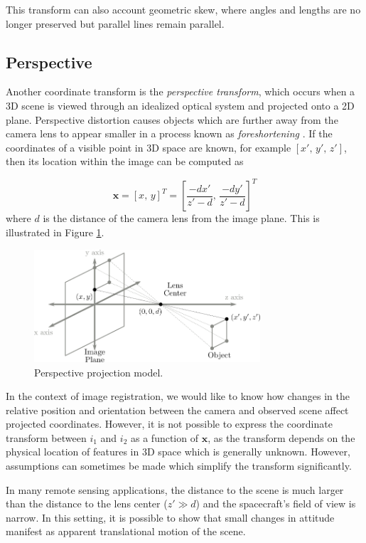 \documentclass[tocnosub,noragright,centerchapter,12pt]{uiucecethesis09}
\begin{document}
This transform can also account geometric skew, where angles and lengths are no longer preserved but parallel lines remain parallel.

\subsection{Perspective}

Another coordinate transform is the \emph{perspective transform}, which occurs when a 3D scene is viewed through an idealized optical system and projected onto a 2D plane.  Perspective distortion causes objects which are further away from the camera lens to appear smaller in a process known as \emph{foreshortening} \cite{brown}.  If the coordinates of a visible point in 3D space are known, for example $[x',\, y',\, z']$, then its location within the image can be computed as

$$\bm{x} = [x,\, y]^T = \left[ \frac{-dx'}{z' - d},\, \frac{-dy'}{z' - d} \right]^T$$
where $d$ is the distance of the camera lens from the image plane.  This is illustrated in Figure \ref{fig:perspective}.

\begin{figure}
  \centering
  \includegraphics[width=0.75\textwidth]{figures/perspective.png}
  \caption{Perspective projection model.}
  \label{fig:perspective}
\end{figure}

In the context of image registration, we would like to know how changes in the relative position and orientation between the camera and observed scene affect projected coordinates.  However, it is not possible to express the coordinate transform between $i_1$ and $i_2$ as a function of $\bm{x}$, as the transform depends on the physical location of features in 3D space which is generally unknown.  However, assumptions can sometimes be made which simplify the transform significantly.

In many remote sensing applications, the distance to the scene is much larger than the distance to the lens center ($z' \gg d$) and the spacecraft's field of view is narrow.  In this setting, it is possible to show that small changes in attitude manifest as apparent translational motion of the scene.
\end{document}
